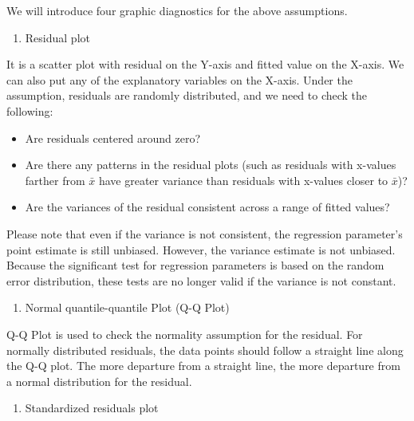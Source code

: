 \documentclass[12pt,]{krantz}
\providecommand{\tightlist}{%
  \setlength{\itemsep}{0pt}\setlength{\parskip}{0pt}}
\begin{document}
We will introduce four graphic diagnostics for the above assumptions.

\begin{enumerate}
\def\labelenumi{(\arabic{enumi})}
\tightlist
\item
  Residual plot 
\end{enumerate}

It is a scatter plot with residual on the Y-axis and fitted value on the X-axis. We can also put any of the explanatory variables on the X-axis. Under the assumption, residuals are randomly distributed, and we need to check the following:

\begin{itemize}
\tightlist
\item
  Are residuals centered around zero?
\item
  Are there any patterns in the residual plots (such as residuals with x-values farther from \(\bar{x}\) have greater variance than residuals with x-values closer to \(\bar{x}\))?
\item
  Are the variances of the residual consistent across a range of fitted values?
\end{itemize}

Please note that even if the variance is not consistent, the regression parameter's point estimate is still unbiased. However, the variance estimate is not unbiased. Because the significant test for regression parameters is based on the random error distribution, these tests are no longer valid if the variance is not constant.

\begin{enumerate}
\def\labelenumi{(\arabic{enumi})}
\setcounter{enumi}{1}
\tightlist
\item
  Normal quantile-quantile Plot (Q-Q Plot) 
\end{enumerate}

Q-Q Plot is used to check the normality assumption for the residual. For normally distributed residuals, the data points should follow a straight line along the Q-Q plot. The more departure from a straight line, the more departure from a normal distribution for the residual.

\begin{enumerate}
\def\labelenumi{(\arabic{enumi})}
\setcounter{enumi}{2}
\tightlist
\item
  Standardized residuals plot 
\end{enumerate}
\end{document}
